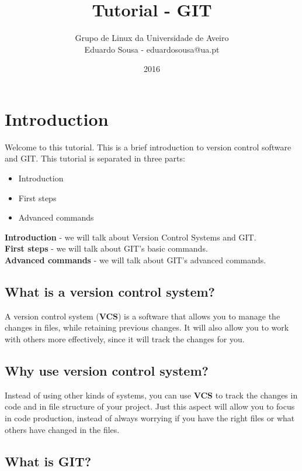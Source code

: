 \documentclass{article}
\title{Tutorial - GIT}
\author{Grupo de Linux da Universidade de Aveiro\\Eduardo Sousa - eduardosousa@ua.pt}
\date{2016}
\begin{document}
\maketitle

\section{Introduction}

Welcome to this tutorial. This is a brief introduction to version control software and GIT. This tutorial is separated in three parts:

\begin{itemize}
\item{Introduction}
\item{First steps}
\item{Advanced commands}
\end{itemize}

\textbf{Introduction} - we will talk about Version Control Systems and GIT.\\
\textbf{First steps} - we will talk about GIT's basic commands.\\
\textbf{Advanced commands} - we will talk about GIT's advanced commands.\\

\subsection{What is a version control system?}

A version control system (\textbf{VCS}) is a software that allows you to manage the changes in files, while retaining previous changes. It will also allow you to work with others more effectively, since it will track the changes for you.

\subsection{Why use version control system?}

Instead of using other kinds of systems, you can use \textbf{VCS} to track the changes in code and in file structure of your project. Just this aspect will allow you to focus in code production, instead of always worrying if you have the right files or what others have changed in the files.

\subsection{What is GIT?}
\end{document}
